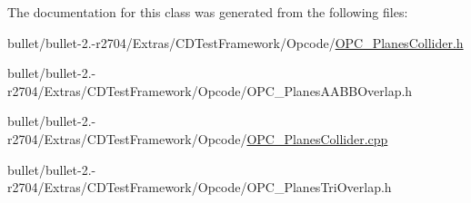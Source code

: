 The documentation for this class was generated from the following files\+:\begin{DoxyCompactItemize}
\item 
bullet/bullet-\/2.-\/r2704/\+Extras/\+C\+D\+Test\+Framework/\+Opcode/\hyperlink{_o_p_c___planes_collider_8h}{O\+P\+C\+\_\+\+Planes\+Collider.\+h}\item 
bullet/bullet-\/2.-\/r2704/\+Extras/\+C\+D\+Test\+Framework/\+Opcode/O\+P\+C\+\_\+\+Planes\+A\+A\+B\+B\+Overlap.\+h\item 
bullet/bullet-\/2.-\/r2704/\+Extras/\+C\+D\+Test\+Framework/\+Opcode/\hyperlink{_o_p_c___planes_collider_8cpp}{O\+P\+C\+\_\+\+Planes\+Collider.\+cpp}\item 
bullet/bullet-\/2.-\/r2704/\+Extras/\+C\+D\+Test\+Framework/\+Opcode/O\+P\+C\+\_\+\+Planes\+Tri\+Overlap.\+h\end{DoxyCompactItemize}
